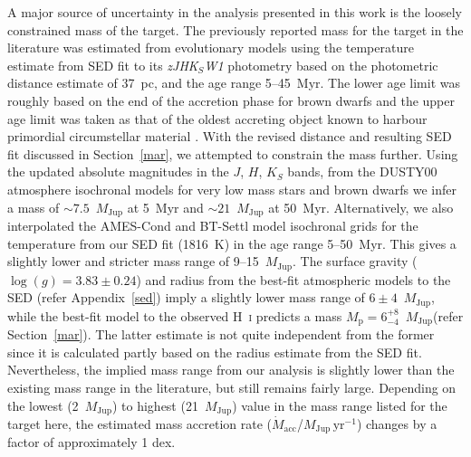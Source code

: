 \documentclass{aa}
\newcommand{\mj}{\ensuremath{M_\mathrm{Jup}}\xspace}
\newcommand{\mjyr}{\ensuremath{M_\mathrm{Jup}\,\mathrm{yr^{-1}}}\xspace}
\newcommand{\Mp}{\ensuremath{M_{\mathrm{p}}}\xspace}
\newcommand{\mdot}{\ensuremath{\dot{M}_{\mathrm{acc}}}\xspace}
\newcommand{\Hi}{H~\textsc{i}\xspace}
\begin{document}
A major source of uncertainty in the analysis presented in this work is the loosely constrained mass of the target. The previously reported mass for the target in the literature  \citep[7--21~\mj;][]{theissen2018} was estimated from evolutionary models using the temperature estimate from SED fit to its \textit{zJHK$_S$W1} photometry based on the photometric distance estimate of 37~pc, and the age range 5--45~Myr. The lower age limit was roughly based on the end of the accretion phase for brown dwarfs \citep{mohanty2005} and the upper age limit was taken as that of the oldest accreting object known to harbour primordial circumstellar material \citep{boucher2016}. With the revised distance and resulting SED fit discussed in Section~\ref{mar}, we attempted to constrain the mass further. Using the updated absolute magnitudes in the $J$, $H$, $K_S$ bands, from the DUSTY00 atmosphere isochronal models for very low mass stars and brown dwarfs \citep{chabrier2000} we infer a mass of $\sim7.5$~\mj at 5~Myr and $\sim21$~\mj at 50~Myr. Alternatively, we also interpolated the AMES-Cond \citep{allard2001} and BT-Settl \citep{allard2012, allard2013} model isochronal grids for the temperature from our SED fit (1816~K) in the age range 5--50~Myr. This gives a slightly lower and stricter mass range of 9--15~\mj. %
The surface gravity ($\log(g)=3.83\pm0.24$) and radius from the best-fit atmospheric models to the SED (refer Appendix~\ref{sed}) imply a slightly lower mass range of $6\pm4$~\mj, while the best-fit \cite{aoyama2018,aoyama2021} model to the observed \Hi predicts a mass $\Mp=6^{+8}_{-4}$~\mj (refer Section~\ref{mar}). The latter estimate is not quite independent from the former since it is calculated partly based on the radius estimate from the SED fit. Nevertheless, the implied mass range from our analysis is slightly lower than the existing mass range in the literature, but still remains fairly large. Depending on the lowest (2~\mj) to highest (21~\mj) value in the mass range listed for the target here, the estimated mass accretion rate (\mdot/\mjyr) changes by a factor of approximately 1 dex. 
\end{document}
